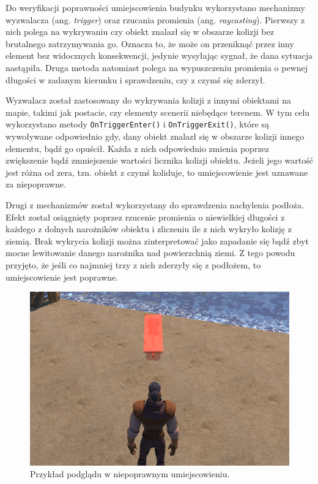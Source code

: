Do weryfikacji poprawności umiejscowienia budynku wykorzystano mechanizmy wyzwalacza (ang. \textit{trigger}) oraz rzucania
promienia (ang. \textit{raycasting}). Pierwszy z nich polega na wykrywaniu czy obiekt znalazł się w obszarze kolizji bez
brutalnego zatrzymywania go. Oznacza to, że może on przeniknąć przez inny element bez widocznych konsekwencji, jedynie
wysyłając sygnał, że dana sytuacja nastąpiła. Druga metoda natomiast polega na wypuszczeniu promienia o pewnej długości
w zadanym kierunku i sprawdzeniu, czy z czymś się zderzył.

Wyzwalacz został zastosowany do wykrywania kolizji z innymi obiektami na mapie, takimi jak postacie, czy elementy
scenerii niebędące terenem. W tym celu wykorzystano metody \verb|OnTriggerEnter()| i \verb|OnTriggerExit()|, które są wywoływane
odpowiednio gdy, dany obiekt znalazł się w obszarze kolizji innego elementu, bądź go opuścił. Każda z nich odpowiednio
zmienia poprzez zwiększenie bądź zmniejszenie wartości licznika kolizji obiektu. Jeżeli jego wartość jest różna od zera, tzn.
obiekt z czymś koliduje, to umiejscowienie jest uznawane za niepoprawne.

Drugi z mechanizmów został wykorzystany do sprawdzenia nachylenia podłoża. Efekt został osiągnięty poprzez rzucenie
promienia o niewielkiej długości z każdego z dolnych narożników obiektu i zliczeniu ile z nich wykryło kolizję z ziemią.
Brak wykrycia kolizji można zinterpretować jako zapadanie się bądź zbyt mocne lewitowanie danego narożnika nad
powierzchnią ziemi. Z tego powodu przyjęto, że jeśli co najmniej trzy z nich zderzyły się z podłożem, to umiejscowienie
jest poprawne.

\begin{figure}[h!]
    \centering
    \includegraphics[width=1\textwidth]{images/implementacja/mechanizm_budowania/niepoprawne.png}
    \caption{Przykład podglądu w niepoprawnym umiejscowieniu.}
\end{figure}
\FloatBarrier

